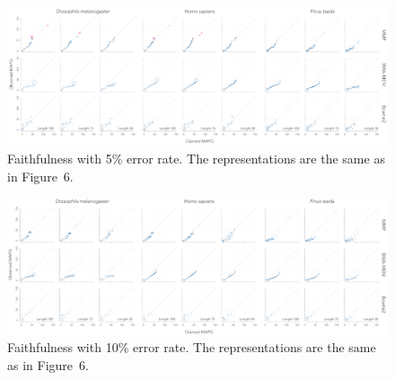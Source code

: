 \documentclass{article}
\begin{document}
\begin{figure}
\begin{center}
\includegraphics[scale=.24]{faith_Q5.pdf}
\end{center}
\caption{Faithfulness with 5\% error rate. The representations are
the same as in Figure~6.}
\end{figure}

\begin{figure}
\begin{center}
\includegraphics[scale=.24]{faith_Q10.pdf}
\end{center}
\caption{Faithfulness with 10\% error rate. The representations are
the same as in Figure~6.}
\end{figure}
\end{document}
